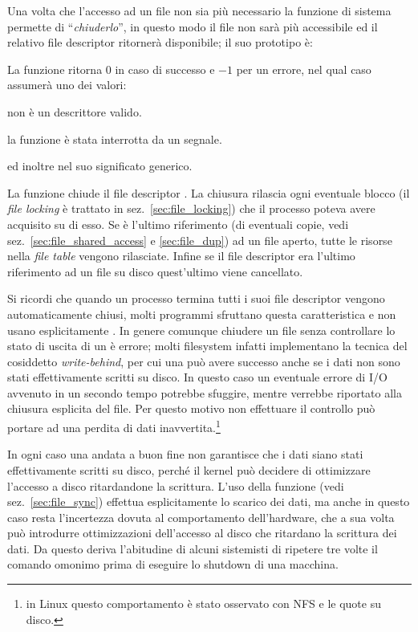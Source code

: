 Una volta che l'accesso ad un file non sia più necessario la funzione di
sistema  permette di ``\textsl{chiuderlo}'', in questo modo il
file non sarà più accessibile ed il relativo file descriptor ritornerà
disponibile; il suo prototipo è:

\begin{funcproto}{
}

{La funzione ritorna $0$ in caso di successo e $-1$ per un errore, nel qual
  caso  assumerà uno dei valori: 
  \begin{errlist}
    \item[\errcode{EBADF}]   non è un descrittore valido.
    \item[\errcode{EINTR}] la funzione è stata interrotta da un segnale.
  \end{errlist}
  ed inoltre  nel suo significato generico.}
\end{funcproto}

La funzione chiude il file descriptor . La chiusura rilascia ogni
eventuale blocco (il \textit{file locking} è trattato in
sez.~\ref{sec:file_locking}) che il processo poteva avere acquisito su di
esso. Se  è l'ultimo riferimento (di eventuali copie, vedi
sez.~\ref{sec:file_shared_access} e \ref{sec:file_dup}) ad un file aperto,
tutte le risorse nella \textit{file table} vengono rilasciate. Infine se il
file descriptor era l'ultimo riferimento ad un file su disco quest'ultimo
viene cancellato.

Si ricordi che quando un processo termina tutti i suoi file descriptor vengono
automaticamente chiusi, molti programmi sfruttano questa caratteristica e non
usano esplicitamente . In genere comunque chiudere un file senza
controllare lo stato di uscita di  un è errore; molti filesystem
infatti implementano la tecnica del cosiddetto 
\textit{write-behind}, per cui una  può avere successo anche se i
dati non sono stati effettivamente scritti su disco. In questo caso un
eventuale errore di I/O avvenuto in un secondo tempo potrebbe sfuggire, mentre
verrebbe riportato alla chiusura esplicita del file. Per questo motivo non
effettuare il controllo può portare ad una perdita di dati
inavvertita.\footnote{in Linux questo comportamento è stato osservato con NFS
  e le quote su disco.}

In ogni caso una  andata a buon fine non garantisce che i dati
siano stati effettivamente scritti su disco, perché il kernel può decidere di
ottimizzare l'accesso a disco ritardandone la scrittura. L'uso della funzione
 (vedi sez.~\ref{sec:file_sync}) effettua esplicitamente lo scarico
dei dati, ma anche in questo caso resta l'incertezza dovuta al comportamento
dell'hardware, che a sua volta può introdurre ottimizzazioni dell'accesso al
disco che ritardano la scrittura dei dati. Da questo deriva l'abitudine di
alcuni sistemisti di ripetere tre volte il comando omonimo prima di eseguire
lo shutdown di una macchina.

